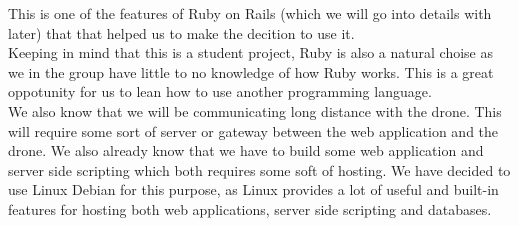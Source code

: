 This is one of the features of Ruby on Rails (which we will go into details with later) that that helped us to make the decition to use it. \\

Keeping in mind that this is a student project, Ruby is also a natural choise as we in the group have little to no knowledge of how Ruby works. 
This is a great oppotunity for us to lean how to use another programming language. \\

We also know that we will be communicating long distance with the drone. 
This will require some sort of server or gateway between the web application and the drone.
We also already know that we have to build some web application and server side scripting which both requires some soft of hosting.
We have decided to use Linux Debian for this purpose, as Linux provides a lot of useful and built-in features for hosting both web applications, server side scripting and databases. 
